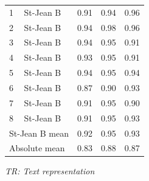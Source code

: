 \begin{table}
{\begin{tabular}{l l c c c}
    1 & St-Jean B & 0.91 & 0.94 & 0.96 \\
    2 & St-Jean B & 0.94 & 0.98 & 0.96 \\
    3 & St-Jean B & 0.94 & 0.95 & 0.91 \\
    4 & St-Jean B & 0.93 & 0.95 & 0.91 \\
    5 & St-Jean B & 0.94 & 0.95 & 0.94 \\
    6 & St-Jean B & 0.87 & 0.90 & 0.93 \\
    7 & St-Jean B & 0.91 & 0.95 & 0.90 \\
    8 & St-Jean B & 0.91 & 0.95 & 0.93 \\
    \midrule
    \multicolumn{2}{l}{St-Jean B mean} & 0.92 & 0.95 & 0.93 \\
    \midrule
    \multicolumn{2}{l}{Absolute mean} & 0.83 & 0.88 & 0.87 \\
    \bottomrule
  \end{tabular}
  }

  \vspace{0.2cm}

  \textit{TR: Text representation}
\end{table}

